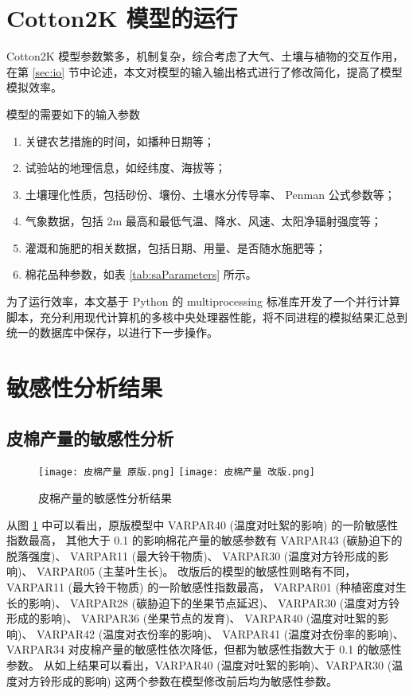 \begin{spacing}{}
    \section{Cotton2K 模型的运行}
    Cotton2K 模型参数繁多，机制复杂，综合考虑了大气、土壤与植物的交互作用，在第 \ref{sec:io} 节中论述，本文对模型的输入输出格式进行了修改简化，提高了模型模拟效率。

    模型的需要如下的输入参数
    \begin{enumerate}
        \item 关键农艺措施的时间，如播种日期等；
        \item 试验站的地理信息，如经纬度、海拔等；
        \item 土壤理化性质，包括砂份、壤份、土壤水分传导率、 Penman 公式参数等；
        \item 气象数据，包括 2m 最高和最低气温、降水、风速、太阳净辐射强度等；
        \item 灌溉和施肥的相关数据，包括日期、用量、是否随水施肥等；
        \item 棉花品种参数，如表 \ref{tab:saParameters} 所示。
    \end{enumerate}

    为了运行效率，本文基于 Python 的 multiprocessing 标准库开发了一个并行计算脚本，充分利用现代计算机的多核中央处理器性能，将不同进程的模拟结果汇总到统一的数据库中保存，以进行下一步操作。


    \section{敏感性分析结果}
    \subsection{皮棉产量的敏感性分析}
    \begin{figure}
        \centering
        \texttt{[image: 皮棉产量 原版.png]}
        \texttt{[image: 皮棉产量 改版.png]}
        \caption{皮棉产量的敏感性分析结果}\label{fig:saLintYield}
    \end{figure}

    从图 \ref{fig:saLintYield} 中可以看出，原版模型中 VARPAR40 (温度对吐絮的影响) 的一阶敏感性指数最高，%
    其他大于 0.1 的影响棉花产量的敏感参数有
    VARPAR43 (碳胁迫下的脱落强度)、%
    VARPAR11 (最大铃干物质)、%
    VARPAR30 (温度对方铃形成的影响)、%
    VARPAR05 (主茎叶生长)。%
    改版后的模型的敏感性则略有不同，%
    VARPAR11 (最大铃干物质) 的一阶敏感性指数最高，%
    VARPAR01 (种植密度对生长的影响)、%
    VARPAR28 (碳胁迫下的坐果节点延迟)、%
    VARPAR30 (温度对方铃形成的影响)、%
    VARPAR36 (坐果节点的发育)、%
    VARPAR40 (温度对吐絮的影响)、%
    VARPAR42 (温度对衣份率的影响)、%
    VARPAR41 (温度对衣份率的影响)、%
    VARPAR34 对皮棉产量的敏感性依次降低，但都为敏感性指数大于 0.1 的敏感性参数。%
    从如上结果可以看出，VARPAR40 (温度对吐絮的影响)、VARPAR30 (温度对方铃形成的影响) 这两个参数在模型修改前后均为敏感性参数。%


\end{spacing}
